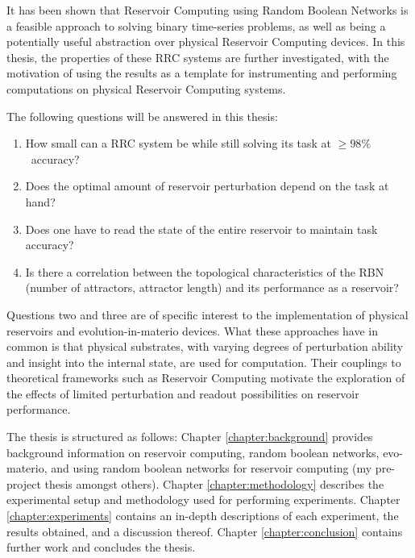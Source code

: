 It has been shown that Reservoir Computing using Random Boolean Networks is a feasible approach to solving binary time-series problems,
as well as being a potentially useful abstraction over physical Reservoir Computing devices.
In this thesis, the properties of these RRC systems are further investigated,
with the motivation of using the results as a template for instrumenting and performing computations on physical Reservoir Computing systems.

The following questions will be answered in this thesis:
\begin{enumerate}
    \item How small can a RRC system be while still solving its task at $ \geq 98\% $ accuracy?
    \item Does the optimal amount of reservoir perturbation depend on the task at hand?
    \item Does one have to read the state of the entire reservoir to maintain task accuracy?
    \item Is there a correlation between the topological characteristics of the RBN (number of attractors, attractor length) and its performance as a reservoir?
\end{enumerate}

Questions two and three are of specific interest to the implementation of physical reservoirs and evolution-in-materio devices.
What these approaches have in common is that physical substrates,
with varying degrees of perturbation ability and insight into the internal state,
are used for computation.
Their couplings to theoretical frameworks such as Reservoir Computing motivate the exploration of the effects of limited perturbation and readout possibilities on reservoir performance.

The thesis is structured as follows:
Chapter \ref{chapter:background} provides background information on reservoir computing, random boolean networks, evo-materio, and using random boolean networks for reservoir computing (my pre-project thesis amongst others).
Chapter \ref{chapter:methodology} describes the experimental setup and methodology used for performing experiments.
Chapter \ref{chapter:experiments} contains an in-depth descriptions of each experiment,
the results obtained, and a discussion thereof.
Chapter \ref{chapter:conclusion} contains further work and concludes the thesis.
